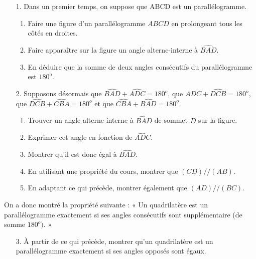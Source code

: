 \documentclass[12 pt]{extarticle}
\theoremstyle{plain}
\begin{document}
 \begin{enumerate}
\item[1.] Dans un premier temps, on suppose que ABCD est un parallélogramme. \begin{enumerate}
 \item Faire une figure d'un parallélogramme $ABCD$ en 
 prolongeant tous les côtés en droites. 
 \item Faire apparaître sur la figure un angle alterne-interne à $\widehat{BAD}$. 
 \item En déduire que la somme de deux angles consécutifs du parallélogramme est $180^o$. 
 \end{enumerate}
 \item[2.] Supposons désormais que $\widehat{BAD}+\widehat{ADC}=180^o$, que $\widehat{ADC}+\widehat{DCB}=180^o$, que $\widehat{DCB}+\widehat{CBA}=180^o$ et que $\widehat{CBA}+\widehat{BAD}=180^o$. 
 \begin{enumerate}
 \item Trouver un angle alterne-interne à $\widehat{BAD}$ de sommet $D$ sur la figure. 
 \item Exprimer cet angle en fonction de $\widehat{ADC}$.
 \item Montrer qu'il est donc égal à $\widehat{BAD}$. 
 \item En utilisant une propriété du cours, montrer que $(CD)//(AB)$. 
 \item En adaptant ce qui précède, montrer également que $(AD)//(BC)$. 
 \end{enumerate}
 \end{enumerate}
 
 On a donc montré la propriété suivante : « Un 
 quadrilatère est un parallélogramme exactement si ses angles consécutifs sont supplémentaire (de somme $180^o)$. »
 \begin{enumerate}
 \item[3.] À partir de ce qui précède, montrer qu'un quadrilatère est un parallélogramme exactement si ses angles opposés sont égaux. 
 \end{enumerate}
 


 	
\end{document}

